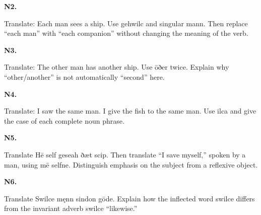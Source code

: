 \par\begin{minipage}{\linewidth}\raggedright
\textbf{N2.}

Translate: Each man sees a ship. Use gehwilc and singular mann. Then replace “each man” with “each companion” without changing the meaning of the verb.

\end{minipage}\par\addvspace{4pt}

\par\begin{minipage}{\linewidth}\raggedright
\textbf{N3.}

Translate: The other man has another ship. Use ōðer twice. Explain why “other/\allowbreak{}another” is not automatically “second” here.

\end{minipage}\par\addvspace{4pt}

\par\begin{minipage}{\linewidth}\raggedright
\textbf{N4.}

Translate: I saw the same man. I give the fish to the same man. Use ilca and give the case of each complete noun phrase.

\end{minipage}\par\addvspace{4pt}

\par\begin{minipage}{\linewidth}\raggedright
\textbf{N5.}

Translate Hē self geseah ðæt scip. Then translate “I save myself,” spoken by a man, using mē selfne. Distinguish emphasis on the subject from a reflexive object.

\end{minipage}\par\addvspace{4pt}

\par\begin{minipage}{\linewidth}\raggedright
\textbf{N6.}

Translate Swilce męnn sindon gōde. Explain how the inflected word swilce differs from the invariant adverb swilce “likewise.”

\end{minipage}\par\addvspace{4pt}

